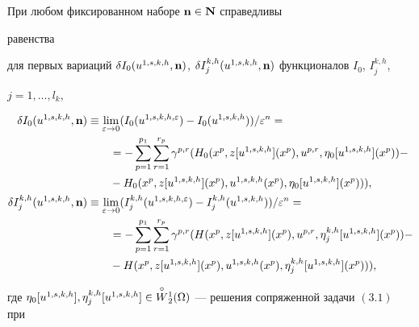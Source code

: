 \begin{lems} 


При любом фиксированном наборе $\bold n\in\bold N$ справедливы 


равенства 


для первых вариаций $\delta I_0(u^{1,s,k,h},\bold n)$, $\delta 


I^{k,h}_j(u^{1,s,k,h},\bold n)$ функционалов $I_0$, $I^{k,h}_j$, 


$j=1,\dotsc,l_k$, 


\begin{align*} 


\delta I_0(u^{1,s,k,h},\bold n)&\equiv\lim_{\varepsilon\to0} 


(I_0(u^{1,s,k,h,\varepsilon})-I_0(u^{1,s,k,h}))/\varepsilon^n= \\ 


% 


&\qquad=-\sum^{p_1}_{p=1}\sum^{r_p}_{r=1}\gamma^{p,r} 


(H_0(x^p,z[u^{1,s,k,h}](x^p),u^{p,r}, 


\eta_0[u^{1,s,k,h}](x^p))- \\ 


% 


&\qquad-H_0(x^p,z[u^{1,s,k,h}](x^p),u^{1,s,k,h}(x^p), 


\eta_0[u^{1,s,k,h}](x^p))),\\ 


% 


\delta I^{k,h}_j(u^{1,s,k,h},\bold n)&\equiv\lim_{\varepsilon\to0} 


(I^{k,h}_j(u^{1,s,k,h,\varepsilon})- 


I^{k,h}_j(u^{1,s,k,h}))/\varepsilon^n= \\ 


% 


&\qquad=-\sum^{p_1}_{p=1}\sum^{r_p}_{r=1}\gamma^{p,r} 


(H(x^p,z[u^{1,s,k,h}](x^p),u^{p,r}, 


\eta^{k,h}_j[u^{1,s,k,h}](x^p))- \\ 


% 


&\qquad-H(x^p,z[u^{1,s,k,h}](x^p),u^{1,s,k,h}(x^p), 


\eta^{k,h}_j[u^{1,s,k,h}](x^p))),\end{align*} 


где $\eta_0[u^{1,s,k,h}],\eta^{k,h}_j[u^{1,s,k,h}]\in 


\up{\circ}{W}^1_2(\Omega)$ --- решения сопряженной задачи $(3.1)$ при 



\end{lems}
